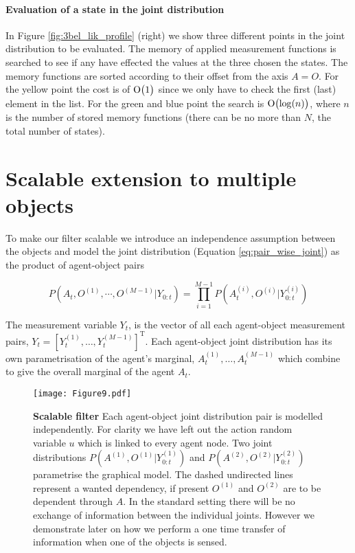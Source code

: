 \documentclass[review]{elsarticle}
\numberwithin{equation}{section}
\begin{document}
\paragraph{Evaluation of a state in the joint distribution}

In Figure \ref{fig:3bel_lik_profile} (right) we show three different points in the joint distribution to be evaluated. The memory of applied measurement functions 
is searched to see if any have effected the values at the three chosen the states. The memory functions are sorted according to their offset from the axis $A=O$. For the yellow point the
cost is of $\operatorname{O}\bigl(1\bigr)$ since we only have to check the first (last) element in the list. For the green and blue point
the search is $\operatorname{O}\bigl(\log(n)\bigr)$, where $n$ is the number of stored memory functions (there can be no more than $N$, the total number of states). 


\section{Scalable extension to multiple objects}\label{subsec:scalabe_extension}

To make our filter scalable we introduce an independence assumption between the objects and model the joint distribution (Equation \ref{eq:pair_wise_joint}) as the product 
of agent-object pairs

\begin{equation}\label{eq:pair_wise_joint}
 P(A_t,O^{(1)},\cdots,O^{(M-1)}|Y_{0:t}) = \prod\limits_{i=1}^{M-1} P(A^{(i)}_t,O^{(i)}|Y^{(i)}_{0:t})
\end{equation}

The measurement variable $Y_t$, is the vector of all each agent-object 
measurement pairs, $Y_t = \left[Y^{(1)}_t,\dots,Y^{(M-1)}_t\right]^{\mathrm{T}}$. Each agent-object joint distribution has its own parametrisation of the agent's marginal,
$A^{(1)}_t,\dots,A^{(M-1)}_t$ which combine to give the overall marginal of the agent $A_t$.

\begin{figure}
\centering
  \texttt{[image: Figure9.pdf]}
  \caption{\textbf{Scalable filter} Each agent-object joint distribution pair is modelled independently. For clarity we have left 
  out the action random variable $u$ which is linked to every agent node.
  Two joint distributions $P(A^{(1)},O^{(1)}|Y^{(1)}_{0:t})$   and $P(A^{(2)},O^{(2)}|Y^{(2)}_{0:t})$ parametrise the graphical model. 
  The dashed undirected lines represent a wanted dependency, if present $O^{(1)}$ and $O^{(2)}$ are to be dependent through $A$. In
  the standard setting there will be no exchange of information between the individual joints. However we demonstrate later on how
  we perform a one time transfer of information when one of the objects is sensed.}
  \label{fig:scalable_mlmf_dae}
\end{figure}
\end{document}
